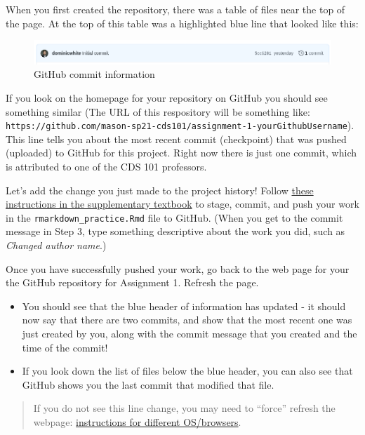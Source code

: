 \documentclass[
]{article}
\providecommand{\tightlist}{%
  \setlength{\itemsep}{0pt}\setlength{\parskip}{0pt}}
\begin{document}
\begin{enumerate}
  When you first created the repository, there was a table of files near
  the top of the page. At the top of this table was a highlighted blue
  line that looked like this:

  \begin{figure}
  \centering
  \includegraphics{img/github-commit-info.png}
  \caption{GitHub commit information}
  \end{figure}

  If you look on the homepage for your repository on GitHub you should
  see something similar (The URL of this respository will be something
  like:
  \texttt{https://github.com/mason-sp21-cds101/assignment-1-yourGithubUsername}).
  This line tells you about the most recent commit (checkpoint) that was
  pushed (uploaded) to GitHub for this project. Right now there is just
  one commit, which is attributed to one of the CDS 101 professors.

  Let's add the change you just made to the project history! Follow
  \href{https://book.cds101.com/how-to-stage-commit-and-push-to-github-using-rstudio-server.html}{these
  instructions in the supplementary textbook} to stage, commit, and push
  your work in the \texttt{rmarkdown\_practice.Rmd} file to GitHub.
  (When you get to the commit message in Step 3, type something
  descriptive about the work you did, such as \emph{Changed author
  name}.)

  Once you have successfully pushed your work, go back to the web page
  for your the GitHub repository for Assignment 1. Refresh the page.

  \begin{itemize}
  \tightlist
  \item
    You should see that the blue header of information has updated - it
    should now say that there are two commits, and show that the most
    recent one was just created by you, along with the commit message
    that you created and the time of the commit!
  \item
    If you look down the list of files below the blue header, you can
    also see that GitHub shows you the last commit that modified that
    file.
  \end{itemize}

  \begin{quote}
  If you do not see this line change, you may need to ``force'' refresh
  the webpage:
  \href{https://www.wikihow.com/Force-Refresh-in-Your-Internet-Browser}{instructions
  for different OS/browsers}.


\end{quote}
\end{enumerate}
\end{document}

